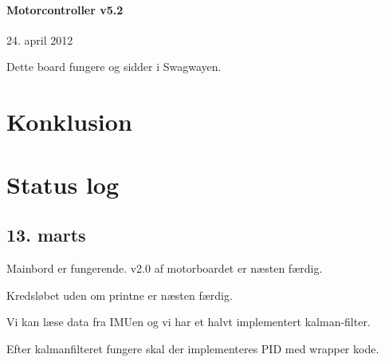 \documentclass[a4paper,oneside,article,danish,table,draft]{memoir}
\newcommand{\boarddate}[1]{\textcolor{blue!80!black}{#1}}
\begin{document}
\subsubsection{Motorcontroller v5.2}
\boarddate{24. april 2012}

Dette board fungere og sidder i Swagwayen.


\chapter{Konklusion} \label{chap:kon}
\clearpage
\listoftables
\listoffigures
 
\clearpage \appendix

\chapter{Status log}

\section{13. marts}
Mainbord er fungerende. v2.0 af motorboardet er næsten færdig.

Kredsløbet uden om printne er næsten færdig.

Vi kan læse data fra IMUen og vi har et halvt implementert kalman-filter.

Efter kalmanfilteret fungere skal der implementeres PID med wrapper kode.
\end{document}

